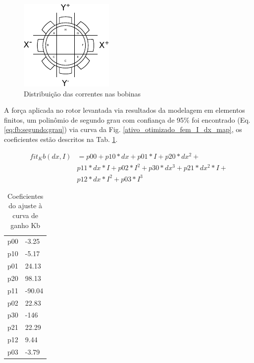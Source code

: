 \begin{figure}[th]
\centering
\includegraphics[width=0.7\linewidth]{./Figs/Modelagem/ativo-atuadores-conexao}
\caption{Distribuição das correntes nas bobinas}
\label{fig:blocos:tensao:bobinas:x:y}
\end{figure}

A força aplicada no rotor levantada via resultados da modelagem em elementos
finitos, um polinômio de segundo grau com confiança de 95\% foi encontrado
(Eq. \ref{eq:fb:segundo:grau}) via curva da Fig.
\ref{ativo_otimizado_fem_I_dx_map}, os coeficientes estão descritos na Tab. \ref{tab:dinamico:ajuste:kb}.

\begin{align}
     fit_Kb(dx,I) &= p00 + p10*dx + p01*I + p20*dx^2 +\\
     & p11*dx*I + p02*I^2 + p30*dx^3 + p21*dx^2*I +\\
     & p12*dx*I^2 + p03*I^3
     \label{eq:fb:segundo:grau}
\end{align}

\begin{table}[ht!]
\centering
\begin{tabular}{c l}
	   p00 & -3.25\\
	   p10 & -5.17\\
	   p01 &  24.13\\
	   p20 &   98.13\\
	   p11 & -90.04\\
	   p02 &  22.83\\
	   p30 &   -146\\
	   p21 &  22.29\\
	   p12 &  9.44	\\
	   p03 & -3.79
\end{tabular} 
\caption{Coeficientes do ajuste à curva de ganho Kb}
\label{tab:dinamico:ajuste:kb}
\end{table}

